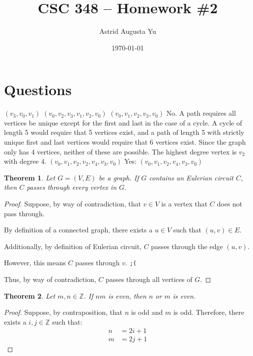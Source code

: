 \documentclass{article}
\author{Astrid Augusta Yu}
\title{CSC 348 -- Homework \#2}
\date{\today}
\newcommand{\contradiction}{\texttt{;(}}
\newtheorem{theorem}{Theorem}
\numberwithin{subcase}{case}
\begin{document}
\maketitle
\tableofcontents

\section{Questions}
\begin{outline}[enumerate]
    \1 
        \2 $(v_3, v_0, v_1)$
        \2 $(v_0, v_2, v_3, v_1, v_2, v_0)$
        \2 $(v_0, v_1, v_2, v_3, v_0)$
        \2 No. A path requires all vertices be unique except for the first 
            and last in the case of a cycle. A cycle of length 5 would require that 
            5 vertices exist, and a path of length 5 with strictly unique first 
            and last vertices would require that 6 vertices exist. Since the graph 
            only has 4 vertices, neither of these are possible.
    \1 
        \2 The highest degree vertex is $v_2$ with degree $4$.
        \2 $(v_0, v_1, v_2, v_2, v_4, v_3, v_0)$
        \2 Yes: $(v_0, v_1, v_2, v_4, v_3, v_0)$
    \1 \begin{theorem}
            Let $G = (V, E)$ be a graph. If $G$ contains an Eulerian circuit $C$, then 
            $C$ passes through every vertex in $G$.
        \end{theorem}
        \begin{proof}
            Suppose, by way of contradiction, that $v \in V$ is a vertex that $C$ does not pass through. 

            By definition of a connected graph, there exists a $u \in V$ such that $(u, v) \in E$.

            Additionally, by definition of Eulerian circuit, $C$ passes through the edge $(u, v)$.

            However, this means $C$ passes through $v$. \contradiction

            Thus, by way of contradiction, $C$ passes through all vertices of $G$.

        \end{proof}
    \1 \begin{theorem}
            Let $m, n \in \mathbb{Z}$. If $nm$ is even, then $n$ or $m$ is even.
        \end{theorem}
        \begin{proof}
            Suppose, by contraposition, that $n$ is odd and $m$ is odd. Therefore, there exists 
            a $i, j \in \mathbb{Z}$ such that:
            \begin{equation}
                \begin{aligned}
                    n &= 2i + 1 \\
                    m &= 2j + 1
                \end{aligned}
            \end{equation}


\end{proof}
\end{outline}
\end{document}
